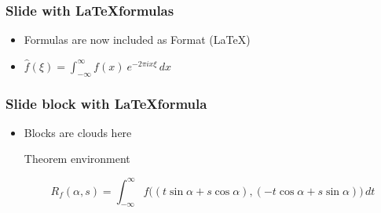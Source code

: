 \documentclass[usepdftitle=false,professionalfonts,compress ]{beamer}
\begin{document}
{
\begin{frame}\frametitle{Slide with \LaTeX formulas}


	\begin{itemize}

	\item Formulas are now included as Format (\LaTeX)

			\item  $\hat{f}(\xi) = \int_{-\infty}^\infty f(x)\ e^{- 2\pi i x \xi}\,dx$
	

				\end{itemize}

\end{frame}
}




{
\begin{frame}\frametitle{Slide block with \LaTeX formula}


	\begin{itemize}

	\item Blocks are clouds here

		\begin{block}{Theorem environment}

\begin{equation}R_f(\alpha,s) = \int_{-\infty}^{\infty} f\big(  (t\sin\alpha+s\cos\alpha), (-t\cos\alpha+s\sin\alpha) \big)\, dt\end{equation}
	
		\end{block}
		
				\end{itemize}

\end{frame}
}
\end{document}
